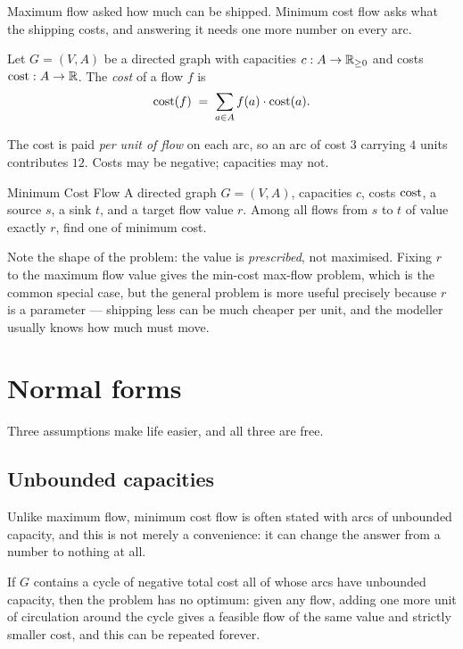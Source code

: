 Maximum flow asked how much can be shipped. Minimum cost flow asks what the
shipping costs, and answering it needs one more number on every arc.

\begin{definition}
Let $G = (V,A)$ be a directed graph with capacities $c : A \to \mathbb{R}_{\ge 0}$ and
costs $\operatorname{cost} : A \to \mathbb{R}$. The \emph{cost} of a flow $f$ is
\[ \operatorname{cost}(f) \;=\; \sum_{a \in A} f(a) \cdot \operatorname{cost}(a). \]
\end{definition}

The cost is paid \emph{per unit of flow} on each arc, so an arc of cost $3$
carrying $4$ units contributes $12$. Costs may be negative; capacities may not.

\begin{probdef}{Minimum Cost Flow}
  \instance A directed graph $G = (V,A)$, capacities $c$, costs $\operatorname{cost}$, a
  source $s$, a sink $t$, and a target flow value $r$.
  \goal Among all flows from $s$ to $t$ of value exactly $r$, find one of
  minimum cost.
\end{probdef}

Note the shape of the problem: the value is \emph{prescribed}, not maximised.
Fixing $r$ to the maximum flow value gives the min-cost max-flow problem, which
is the common special case, but the general problem is more useful precisely
because $r$ is a parameter --- shipping less can be much cheaper per unit, and
the modeller usually knows how much must move.

\section{Normal forms}
\label{sec:mcf-normal-forms}

Three assumptions make life easier, and all three are free.

\subsection{Unbounded capacities}
\label{sec:mcf-unbounded}

Unlike maximum flow, minimum cost flow is often stated with arcs of unbounded
capacity, and this is not merely a convenience: it can change the answer from a
number to nothing at all.

\begin{observation}\label{obs:mcf-unbounded}
If $G$ contains a cycle of negative total cost all of whose arcs have unbounded
capacity, then the problem has no optimum: given any flow, adding one more unit
of circulation around the cycle gives a feasible flow of the same value and
strictly smaller cost, and this can be repeated forever.
\end{observation}

